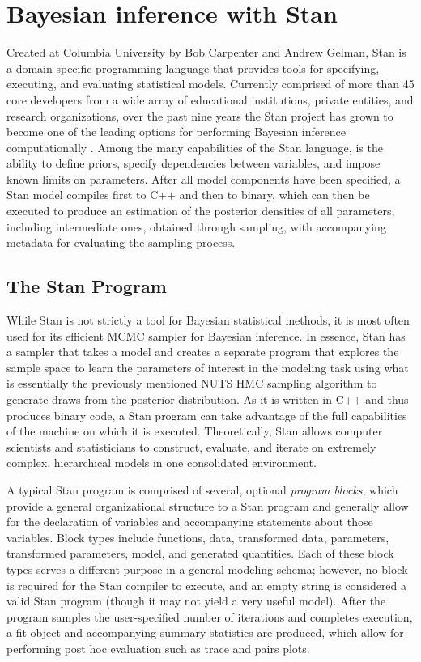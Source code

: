 \documentclass[
  12pt,
  twoside]{book}
\theoremstyle{definition}
\theoremstyle{definition}
\theoremstyle{definition}
\theoremstyle{remark}
\begin{document}
\hypertarget{bayesian-inference-with-stan}{%
\chapter{Bayesian inference with Stan}\label{bayesian-inference-with-stan}}

Created at Columbia University by Bob Carpenter and Andrew Gelman, Stan is a domain-specific programming language that provides tools for specifying, executing, and evaluating statistical models.
Currently comprised of more than 45 core developers from a wide array of educational institutions, private entities, and research organizations, over the past nine years the Stan project has grown to become one of the leading options for performing Bayesian inference computationally \citep{Stan2021}.
Among the many capabilities of the Stan language, is the ability to define priors, specify dependencies between variables, and impose known limits on parameters.
After all model components have been specified, a Stan model compiles first to C++ and then to binary, which can then be executed to produce an estimation of the posterior densities of all parameters, including intermediate ones, obtained through sampling, with accompanying metadata for evaluating the sampling process.

\hypertarget{the-stan-program}{%
\section{The Stan Program}\label{the-stan-program}}

While Stan is not strictly a tool for Bayesian statistical methods, it is most often used for its efficient MCMC sampler for Bayesian inference.
In essence, Stan has a sampler that takes a model and creates a separate program that explores the sample space to learn the parameters of interest in the modeling task using what is essentially the previously mentioned NUTS HMC sampling algorithm to generate draws from the posterior distribution.
As it is written in C++ and thus produces binary code, a Stan program can take advantage of the full capabilities of the machine on which it is executed.
Theoretically, Stan allows computer scientists and statisticians to construct, evaluate, and iterate on extremely complex, hierarchical models in one consolidated environment.

A typical Stan program is comprised of several, optional \emph{program blocks}, which provide a general organizational structure to a Stan program and generally allow for the declaration of variables and accompanying statements about those variables.
Block types include functions, data, transformed data, parameters, transformed parameters, model, and generated quantities.
Each of these block types serves a different purpose in a general modeling schema; however, no block is required for the Stan compiler to execute, and an empty string is considered a valid Stan program (though it may not yield a very useful model).
After the program samples the user-specified number of iterations and completes execution, a fit object and accompanying summary statistics are produced, which allow for performing post hoc evaluation such as trace and pairs plots.
\end{document}
